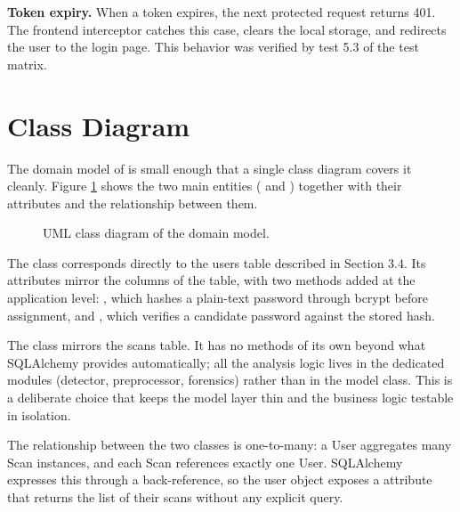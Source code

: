 \noindent\textbf{Token expiry.} When a token expires, the next protected request returns 401. The frontend interceptor catches this case, clears the local storage, and redirects the user to the login page. This behavior was verified by test 5.3 of the test matrix.

\section{Class Diagram}

The domain model of \deepguard{} is small enough that a single class diagram covers it cleanly. Figure \ref{fig:class} shows the two main entities ( and ) together with their attributes and the relationship between them.

\begin{figure}[H]
\centering
{}
\caption{UML class diagram of the domain model.}
\label{fig:class}
\end{figure}

The  class corresponds directly to the users table described in Section 3.4. Its attributes mirror the columns of the table, with two methods added at the application level: , which hashes a plain-text password through bcrypt before assignment, and , which verifies a candidate password against the stored hash.

The  class mirrors the scans table. It has no methods of its own beyond what SQLAlchemy provides automatically; all the analysis logic lives in the dedicated modules (detector, preprocessor, forensics) rather than in the model class. This is a deliberate choice that keeps the model layer thin and the business logic testable in isolation.

The relationship between the two classes is one-to-many: a User aggregates many Scan instances, and each Scan references exactly one User. SQLAlchemy expresses this through a back-reference, so the user object exposes a  attribute that returns the list of their scans without any explicit query.

